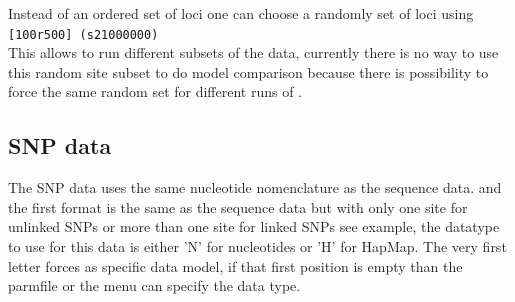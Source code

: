 Instead of an ordered set of loci one can choose a randomly set of loci using\\
\texttt{[100r500] (s21000000)}\\
This allows to run different subsets of the data, currently there is no way to use this random site subset to do model comparison because there is possibility to force the same random set for different runs of \migrate.
\newpage
\subsection{SNP data}
The SNP data uses the same nucleotide nomenclature as the sequence data.
and the first format is the same as the sequence data but with only one site for unlinked SNPs or more than one site
for linked SNPs see example, the datatype to use for this data is either 'N' for nucleotides or 'H' for HapMap.
The very first letter forces as specific data model, if that first position is empty than the parmfile or the menu can specify the data type.
\begin{flushleft}
\begin{small}
\end{small}
\end{flushleft}


